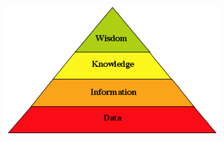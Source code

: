 \documentclass{beamer}
\begin{document}
\begin{frame}
	\begin{figure}
\centering
\includegraphics[width=1.1\linewidth]{KnowledgePyramid}
\end{figure}
\end{frame}





\end{document}
